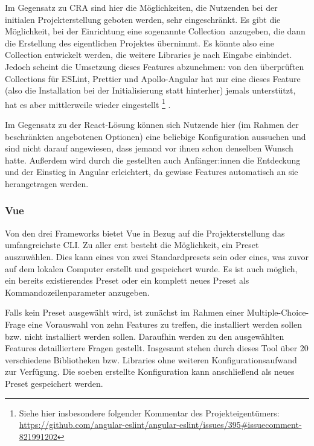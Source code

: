 Im Gegensatz zu \gls{CRA} sind hier die Möglichkeiten, die Nutzenden bei der initialen Projekterstellung geboten werden, sehr eingeschränkt. Es gibt die Möglichkeit, bei der Einrichtung eine sogenannte \glqq Collection\grqq\ anzugeben, die dann die Erstellung des eigentlichen Projektes übernimmt. Es könnte also eine Collection entwickelt werden, die weitere Libraries je nach Eingabe einbindet. Jedoch scheint die Umsetzung dieses Features abzunehmen: von den überprüften Collections für ESLint, Prettier und Apollo-Angular hat nur eine dieses Feature (also die Installation bei der Initialisierung statt hinterher) jemals unterstützt, hat es aber mittlerweile wieder eingestellt \cite{angular_eslint}\footnote{Siehe hier insbesondere folgender Kommentar des Projekteigentümers: \url{https://github.com/angular-eslint/angular-eslint/issues/395\#issuecomment-821991202}} \cite{prettier_angular_collection_file} \cite{apollo_angular_collection_file}.

Im Gegensatz zu der React-Lösung können sich Nutzende hier (im Rahmen der beschränkten angebotenen Optionen) eine beliebige Konfiguration aussuchen und sind nicht darauf angewiesen, dass jemand vor ihnen schon denselben Wunsch hatte. Außerdem wird durch die gestellten auch Anfänger:innen die Entdeckung und der Einstieg in Angular erleichtert, da gewisse Features automatisch an sie herangetragen werden.


\subsubsection{Vue}
Von den drei Frameworks bietet Vue in Bezug auf die Projekterstellung das umfangreichste \gls{CLI}. Zu aller erst besteht die Möglichkeit, ein Preset auszuwählen. Dies kann eines von zwei Standardpresets sein oder eines, was zuvor auf dem lokalen Computer erstellt und gespeichert wurde. Es ist auch möglich, ein bereits existierendes Preset oder ein komplett neues Preset als Kommandozeilenparameter anzugeben.

Falls kein Preset ausgewählt wird, ist zunächst im Rahmen einer Multiple-Choice-Frage eine Vorauswahl von zehn Features zu treffen, die installiert werden sollen bzw. nicht installiert werden sollen. Daraufhin werden zu den ausgewählten Features detailliertere Fragen gestellt. Insgesamt stehen durch dieses Tool über 20 verschiedene Bibliotheken bzw. Libraries ohne weiteren Konfigurationsaufwand zur Verfügung. Die soeben erstellte Konfiguration kann anschließend als neues Preset gespeichert werden.

